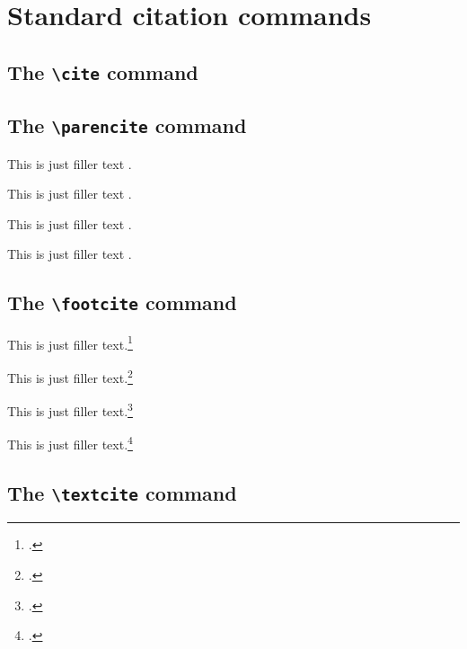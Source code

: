 \documentclass[a4paper]{article}
\newcommand{\cmd}[1]{\texttt{\textbackslash #1}}
\begin{document}
\section*{Standard citation commands}

\subsection*{The \cmd{cite} command}


\cite{companion}

\cite[59]{companion}

\cite[see][]{companion}

\cite[see][59--63]{companion}

\subsection*{The \cmd{parencite} command}


This is just filler text \parencite{companion}.

This is just filler text \parencite[59]{companion}.

This is just filler text \parencite[see][]{companion}.

This is just filler text \parencite[see][59--63]{companion}.

\subsection*{The \cmd{footcite} command}


This is just filler text.\footcite{companion}

This is just filler text.\footcite[59]{companion}

This is just filler text.\footcite[See][]{companion}

This is just filler text.\footcite[See][59--63]{companion}

\subsection*{The \cmd{textcite} command}
\end{document}

